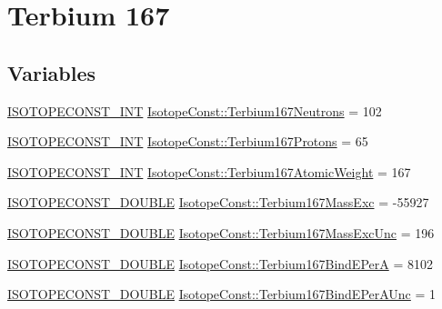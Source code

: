 \hypertarget{group___isotope_const-_terbium-_tb167}{}\section{Terbium 167}
\label{group___isotope_const-_terbium-_tb167}
\subsection*{Variables}
\begin{DoxyCompactItemize}
\item 
\mbox{\hyperlink{group___isotope_const-_macros_ga5f18360b3e99483a35c32d789e62621c}{I\+S\+O\+T\+O\+P\+E\+C\+O\+N\+S\+T\+\_\+\+I\+NT}} \mbox{\hyperlink{group___isotope_const-_terbium-_tb167_ga734b49ccf61e8c50d005592b45e673b3}{Isotope\+Const\+::\+Terbium167\+Neutrons}} = 102
\item 
\mbox{\hyperlink{group___isotope_const-_macros_ga5f18360b3e99483a35c32d789e62621c}{I\+S\+O\+T\+O\+P\+E\+C\+O\+N\+S\+T\+\_\+\+I\+NT}} \mbox{\hyperlink{group___isotope_const-_terbium-_tb167_ga4ef09b011dd4e99cd30ad4a75e959347}{Isotope\+Const\+::\+Terbium167\+Protons}} = 65
\item 
\mbox{\hyperlink{group___isotope_const-_macros_ga5f18360b3e99483a35c32d789e62621c}{I\+S\+O\+T\+O\+P\+E\+C\+O\+N\+S\+T\+\_\+\+I\+NT}} \mbox{\hyperlink{group___isotope_const-_terbium-_tb167_gaa0faf0874a959e64070504e49a06d67c}{Isotope\+Const\+::\+Terbium167\+Atomic\+Weight}} = 167
\item 
\mbox{\hyperlink{group___isotope_const-_macros_ga8f45a7272ce02c0b4c65c44636ed719a}{I\+S\+O\+T\+O\+P\+E\+C\+O\+N\+S\+T\+\_\+\+D\+O\+U\+B\+LE}} \mbox{\hyperlink{group___isotope_const-_terbium-_tb167_gad6ac52bc9282a0abd587c20ad1c4bd9a}{Isotope\+Const\+::\+Terbium167\+Mass\+Exc}} = -\/55927
\item 
\mbox{\hyperlink{group___isotope_const-_macros_ga8f45a7272ce02c0b4c65c44636ed719a}{I\+S\+O\+T\+O\+P\+E\+C\+O\+N\+S\+T\+\_\+\+D\+O\+U\+B\+LE}} \mbox{\hyperlink{group___isotope_const-_terbium-_tb167_ga7b9cd29f7760ff17b6f3ab25884023dd}{Isotope\+Const\+::\+Terbium167\+Mass\+Exc\+Unc}} = 196
\item 
\mbox{\hyperlink{group___isotope_const-_macros_ga8f45a7272ce02c0b4c65c44636ed719a}{I\+S\+O\+T\+O\+P\+E\+C\+O\+N\+S\+T\+\_\+\+D\+O\+U\+B\+LE}} \mbox{\hyperlink{group___isotope_const-_terbium-_tb167_ga71675b3990d72c34cfd8bada7cb2f703}{Isotope\+Const\+::\+Terbium167\+Bind\+E\+PerA}} = 8102
\item 
\mbox{\hyperlink{group___isotope_const-_macros_ga8f45a7272ce02c0b4c65c44636ed719a}{I\+S\+O\+T\+O\+P\+E\+C\+O\+N\+S\+T\+\_\+\+D\+O\+U\+B\+LE}} \mbox{\hyperlink{group___isotope_const-_terbium-_tb167_ga972d2bf8f148480fa111a2474f89cc26}{Isotope\+Const\+::\+Terbium167\+Bind\+E\+Per\+A\+Unc}} = 1

\end{DoxyCompactItemize}
